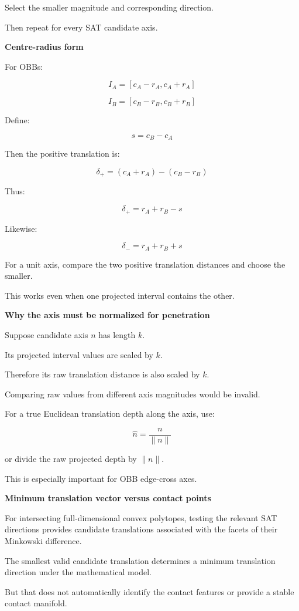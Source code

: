 Select the smaller magnitude and corresponding direction.

Then repeat for every SAT candidate axis.

\textbf{Centre-radius form}

For OBBs:

\[
I_A=[c_A-r_A,c_A+r_A]
\]

\[
I_B=[c_B-r_B,c_B+r_B]
\]

Define:

\[
s=c_B-c_A
\]

Then the positive translation is:

\[
\delta_+ = (c_A+r_A)-(c_B-r_B)
\]

Thus:

\[
\boxed{ \delta_+=r_A+r_B-s }
\]

Likewise:

\[
\boxed{ \delta_-=r_A+r_B+s }
\]

For a unit axis, compare the two positive translation distances and choose the smaller.

This works even when one projected interval contains the other.

\textbf{Why the axis must be normalized for penetration}

Suppose candidate axis \(n\) has length \(k\).

Its projected interval values are scaled by \(k\).

Therefore its raw translation distance is also scaled by \(k\).

Comparing raw values from different axis magnitudes would be invalid.

For a true Euclidean translation depth along the axis, use:

\[
\boxed{ \hat n=\frac n{\|n\|} }
\]

or divide the raw projected depth by \(\|n\|\).

This is especially important for OBB edge-cross axes.

\textbf{Minimum translation vector versus contact points}

For intersecting full-dimensional convex polytopes, testing the relevant SAT directions provides candidate translations associated with the facets of their Minkowski difference.

The smallest valid candidate translation determines a minimum translation direction under the mathematical model.

But that does not automatically identify the contact features or provide a stable contact manifold.

